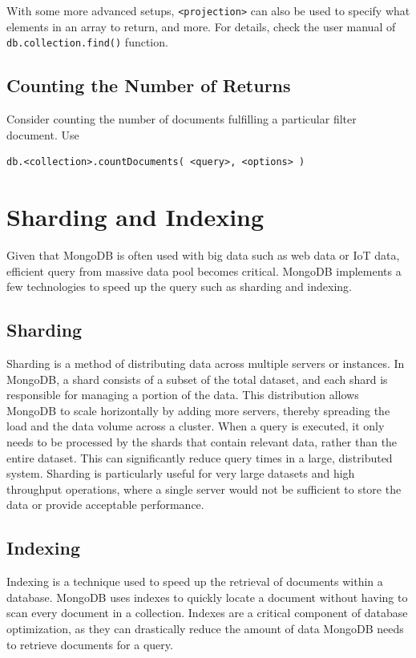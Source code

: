 With some more advanced setups, \verb|<projection>| can also be used to specify what elements in an array to return, and more. For details, check the user manual of \verb|db.collection.find()| function.

\subsection{Counting the Number of Returns}

Consider counting the number of documents fulfilling a particular filter document. Use
\begin{lstlisting}
db.<collection>.countDocuments( <query>, <options> )
\end{lstlisting}

\section{Sharding and Indexing}

Given that MongoDB is often used with big data such as web data or IoT data, efficient query from massive data pool becomes critical. MongoDB implements a few technologies to speed up the query such as sharding and indexing.

\subsection{Sharding}

Sharding is a method of distributing data across multiple servers or instances. In MongoDB, a shard consists of a subset of the total dataset, and each shard is responsible for managing a portion of the data. This distribution allows MongoDB to scale horizontally by adding more servers, thereby spreading the load and the data volume across a cluster. When a query is executed, it only needs to be processed by the shards that contain relevant data, rather than the entire dataset. This can significantly reduce query times in a large, distributed system. Sharding is particularly useful for very large datasets and high throughput operations, where a single server would not be sufficient to store the data or provide acceptable performance.

\subsection{Indexing}

Indexing is a technique used to speed up the retrieval of documents within a database. MongoDB uses indexes to quickly locate a document without having to scan every document in a collection. Indexes are a critical component of database optimization, as they can drastically reduce the amount of data MongoDB needs to retrieve documents for a query. 

